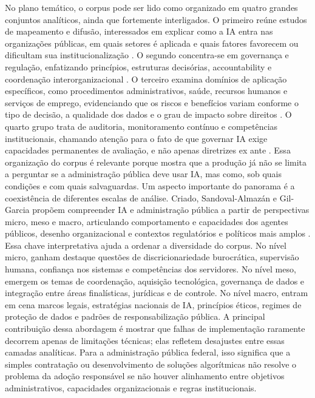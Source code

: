 \documentclass[12pt,a4paper]{article}
\begin{document}
No plano temático, o corpus pode ser lido como organizado em quatro grandes conjuntos analíticos, ainda que fortemente interligados. O primeiro reúne estudos de mapeamento e difusão, interessados em explicar como a IA entra nas organizações públicas, em quais setores é aplicada e quais fatores favorecem ou dificultam sua institucionalização \autocite{madan2022ai} \autocite{david2023understanding}. O segundo concentra-se em governança e regulação, enfatizando princípios, estruturas decisórias, accountability e coordenação interorganizacional \autocite{batool2025ai} \autocite{sigfrids2022how} \autocite{goulart2025processos}. O terceiro examina domínios de aplicação específicos, como procedimentos administrativos, saúde, recursos humanos e serviços de emprego, evidenciando que os riscos e benefícios variam conforme o tipo de decisão, a qualidade dos dados e o grau de impacto sobre direitos \autocite{parycek2023artificial} \autocite{lemes2020o} \autocite{cho2023human} \autocite{krtner2021predictive}. O quarto grupo trata de auditoria, monitoramento contínuo e competências institucionais, chamando atenção para o fato de que governar IA exige capacidades permanentes de avaliação, e não apenas diretrizes ex ante \autocite{minkkinen2022continuous} \autocite{mkander2023auditing} \autocite{melo2026competencias}. Essa organização do corpus é relevante porque mostra que a produção já não se limita a perguntar se a administração pública deve usar IA, mas como, sob quais condições e com quais salvaguardas.
Um aspecto importante do panorama é a coexistência de diferentes escalas de análise. Criado, Sandoval-Almazán e Gil-Garcia propõem compreender IA e administração pública a partir de perspectivas micro, meso e macro, articulando comportamento e capacidades dos agentes públicos, desenho organizacional e contextos regulatórios e políticos mais amplos \autocite{criado2024artificial}. Essa chave interpretativa ajuda a ordenar a diversidade do corpus. No nível micro, ganham destaque questões de discricionariedade burocrática, supervisão humana, confiança nos sistemas e competências dos servidores. No nível meso, emergem os temas de coordenação, aquisição tecnológica, governança de dados e integração entre áreas finalísticas, jurídicas e de controle. No nível macro, entram em cena marcos legais, estratégias nacionais de IA, princípios éticos, regimes de proteção de dados e padrões de responsabilização pública. A principal contribuição dessa abordagem é mostrar que falhas de implementação raramente decorrem apenas de limitações técnicas; elas refletem desajustes entre essas camadas analíticas. Para a administração pública federal, isso significa que a simples contratação ou desenvolvimento de soluções algorítmicas não resolve o problema da adoção responsável se não houver alinhamento entre objetivos administrativos, capacidades organizacionais e regras institucionais.
\end{document}
